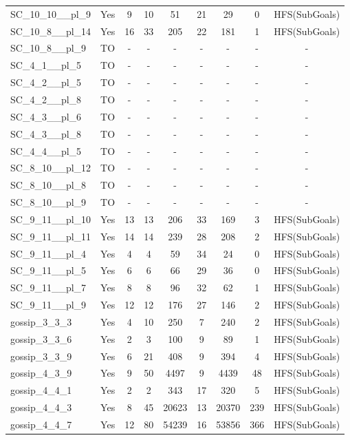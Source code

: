 \documentclass{article}
\begin{document}
\begin{tabular}{lcccccccc}
SC\_10\_10\_\_pl\_9 & Yes & 9 & 10 & 51 & 21 & 29 & 0 & HFS(SubGoals) \\
SC\_10\_8\_\_pl\_14 & Yes & 16 & 33 & 205 & 22 & 181 & 1 & HFS(SubGoals) \\
SC\_10\_8\_\_pl\_9 & TO & - & - & - & - & - & - & - \\
SC\_4\_1\_\_pl\_5 & TO & - & - & - & - & - & - & - \\
SC\_4\_2\_\_pl\_5 & TO & - & - & - & - & - & - & - \\
SC\_4\_2\_\_pl\_8 & TO & - & - & - & - & - & - & - \\
SC\_4\_3\_\_pl\_6 & TO & - & - & - & - & - & - & - \\
SC\_4\_3\_\_pl\_8 & TO & - & - & - & - & - & - & - \\
SC\_4\_4\_\_pl\_5 & TO & - & - & - & - & - & - & - \\
SC\_8\_10\_\_pl\_12 & TO & - & - & - & - & - & - & - \\
SC\_8\_10\_\_pl\_8 & TO & - & - & - & - & - & - & - \\
SC\_8\_10\_\_pl\_9 & TO & - & - & - & - & - & - & - \\
SC\_9\_11\_\_pl\_10 & Yes & 13 & 13 & 206 & 33 & 169 & 3 & HFS(SubGoals) \\
SC\_9\_11\_\_pl\_11 & Yes & 14 & 14 & 239 & 28 & 208 & 2 & HFS(SubGoals) \\
SC\_9\_11\_\_pl\_4 & Yes & 4 & 4 & 59 & 34 & 24 & 0 & HFS(SubGoals) \\
SC\_9\_11\_\_pl\_5 & Yes & 6 & 6 & 66 & 29 & 36 & 0 & HFS(SubGoals) \\
SC\_9\_11\_\_pl\_7 & Yes & 8 & 8 & 96 & 32 & 62 & 1 & HFS(SubGoals) \\
SC\_9\_11\_\_pl\_9 & Yes & 12 & 12 & 176 & 27 & 146 & 2 & HFS(SubGoals) \\
gossip\_3\_3\_3 & Yes & 4 & 10 & 250 & 7 & 240 & 2 & HFS(SubGoals) \\
gossip\_3\_3\_6 & Yes & 2 & 3 & 100 & 9 & 89 & 1 & HFS(SubGoals) \\
gossip\_3\_3\_9 & Yes & 6 & 21 & 408 & 9 & 394 & 4 & HFS(SubGoals) \\
gossip\_4\_3\_9 & Yes & 9 & 50 & 4497 & 9 & 4439 & 48 & HFS(SubGoals) \\
gossip\_4\_4\_1 & Yes & 2 & 2 & 343 & 17 & 320 & 5 & HFS(SubGoals) \\
gossip\_4\_4\_3 & Yes & 8 & 45 & 20623 & 13 & 20370 & 239 & HFS(SubGoals) \\
gossip\_4\_4\_7 & Yes & 12 & 80 & 54239 & 16 & 53856 & 366 & HFS(SubGoals) \\

\end{tabular}
\end{document}
